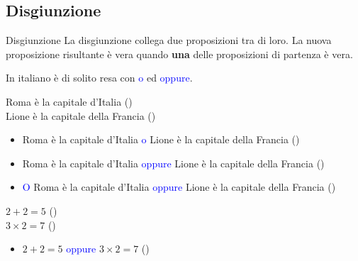 \documentclass[aspectratio=169,10pt]{beamer}
\newcommand{\xmark}{{\color{red}{\ding{55}}}}
\newcommand{\conn}[1]{\textcolor{blue}{#1}}
\begin{document}
\subsection{Disgiunzione}

\begin{frame}{Disgiunzione}
    La \alert{disgiunzione} collega due proposizioni tra di loro. La nuova proposizione risultante è vera quando \textbf{una} delle proposizioni di partenza è vera. \medskip

    In italiano è di solito resa con \conn{o} ed \conn{oppure}.
    \begin{example}
        Roma è la capitale d'Italia (\checkmark)\\
        Lione è la capitale della Francia (\xmark)\\
        \pause
        \begin{itemize}
            \item Roma è la capitale d'Italia \conn{o} Lione è la capitale della Francia (\checkmark)
            \item Roma è la capitale d'Italia \conn{oppure} Lione è la capitale della Francia (\checkmark)
            \item \conn{O} Roma è la capitale d'Italia \conn{oppure} Lione è la capitale della Francia (\checkmark)
        \end{itemize}
        \medskip

        \pause
        $2+2 = 5$ (\xmark) \\
        $3 \times 2= 7$  (\xmark) \pause
        \begin{itemize}
            \item  $2+2 = 5$ \conn{oppure} $3 \times 2= 7$  (\xmark)
        \end{itemize}
    \end{example}
\end{frame}
\end{document}
